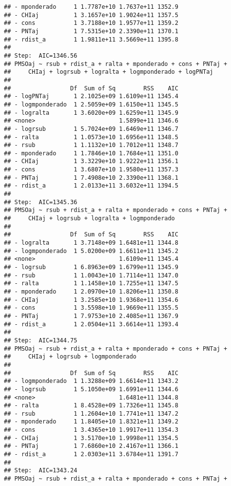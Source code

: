 \documentclass[
]{article}
\begin{document}
\begin{verbatim}
## - mponderado     1 1.7787e+10 1.7637e+11 1352.9
## - CHIaj          1 3.1657e+10 1.9024e+11 1357.5
## - cons           1 3.7188e+10 1.9577e+11 1359.2
## - PNTaj          1 7.5315e+10 2.3390e+11 1370.1
## - rdist_a        1 1.9811e+11 3.5669e+11 1395.8
## 
## Step:  AIC=1346.56
## PMSOaj ~ rsub + rdist_a + ralta + mponderado + cons + PNTaj + 
##     CHIaj + logrsub + logralta + logmponderado + logPNTaj
## 
##                 Df  Sum of Sq        RSS    AIC
## - logPNTaj       1 2.1025e+09 1.6109e+11 1345.4
## - logmponderado  1 2.5059e+09 1.6150e+11 1345.5
## - logralta       1 3.6020e+09 1.6259e+11 1345.9
## <none>                        1.5899e+11 1346.6
## - logrsub        1 5.7024e+09 1.6469e+11 1346.7
## - ralta          1 1.0573e+10 1.6956e+11 1348.5
## - rsub           1 1.1132e+10 1.7012e+11 1348.7
## - mponderado     1 1.7846e+10 1.7684e+11 1351.0
## - CHIaj          1 3.3229e+10 1.9222e+11 1356.1
## - cons           1 3.6807e+10 1.9580e+11 1357.3
## - PNTaj          1 7.4908e+10 2.3390e+11 1368.1
## - rdist_a        1 2.0133e+11 3.6032e+11 1394.5
## 
## Step:  AIC=1345.36
## PMSOaj ~ rsub + rdist_a + ralta + mponderado + cons + PNTaj + 
##     CHIaj + logrsub + logralta + logmponderado
## 
##                 Df  Sum of Sq        RSS    AIC
## - logralta       1 3.7148e+09 1.6481e+11 1344.8
## - logmponderado  1 5.0200e+09 1.6611e+11 1345.2
## <none>                        1.6109e+11 1345.4
## - logrsub        1 6.8963e+09 1.6799e+11 1345.9
## - rsub           1 1.0043e+10 1.7114e+11 1347.0
## - ralta          1 1.1458e+10 1.7255e+11 1347.5
## - mponderado     1 2.0970e+10 1.8206e+11 1350.8
## - CHIaj          1 3.2585e+10 1.9368e+11 1354.6
## - cons           1 3.5598e+10 1.9669e+11 1355.5
## - PNTaj          1 7.9753e+10 2.4085e+11 1367.9
## - rdist_a        1 2.0504e+11 3.6614e+11 1393.4
## 
## Step:  AIC=1344.75
## PMSOaj ~ rsub + rdist_a + ralta + mponderado + cons + PNTaj + 
##     CHIaj + logrsub + logmponderado
## 
##                 Df  Sum of Sq        RSS    AIC
## - logmponderado  1 1.3288e+09 1.6614e+11 1343.2
## - logrsub        1 5.1050e+09 1.6991e+11 1344.6
## <none>                        1.6481e+11 1344.8
## - ralta          1 8.4528e+09 1.7326e+11 1345.8
## - rsub           1 1.2604e+10 1.7741e+11 1347.2
## - mponderado     1 1.8405e+10 1.8321e+11 1349.2
## - cons           1 3.4365e+10 1.9917e+11 1354.3
## - CHIaj          1 3.5170e+10 1.9998e+11 1354.5
## - PNTaj          1 7.6860e+10 2.4167e+11 1366.1
## - rdist_a        1 2.0303e+11 3.6784e+11 1391.7
## 
## Step:  AIC=1343.24
## PMSOaj ~ rsub + rdist_a + ralta + mponderado + cons + PNTaj + 

\end{verbatim}
\end{document}
